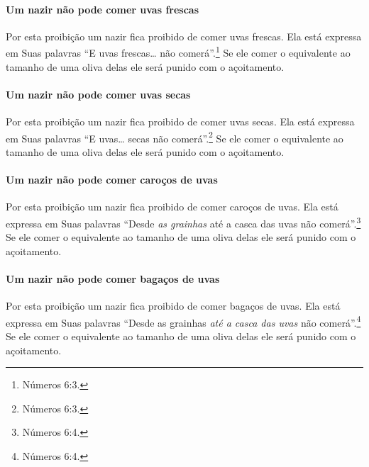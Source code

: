 \begin{multicols}{2}
\paragraph{Um nazir\starr{} não pode comer uvas frescas}

Por esta proibição um nazir\starr{} fica proibido de comer uvas frescas. Ela
está expressa em Suas palavras ``E uvas frescas\ldots{} não comerá''.\footnote{Números 6:3.} Se ele comer o equivalente ao tamanho de uma oliva delas
ele será punido com o açoitamento.

\paragraph{Um nazir\starr{} não pode comer uvas secas}

Por esta proibição um nazir\starr{} fica proibido de comer uvas secas. Ela está
expressa em Suas palavras ``E uvas\ldots{} secas não comerá''.\footnote{Números 6:3.}
Se ele comer o equivalente ao tamanho de uma oliva delas ele será punido
com o açoitamento.

\paragraph{Um nazir\starr{} não pode comer caroços de uvas}

Por esta proibição um nazir\starr{} fica proibido de comer caroços de uvas. Ela
está expressa em Suas palavras ``Desde \emph{as grainhas} até a casca
das uvas não comerá''.\footnote{Números 6:4.} Se ele comer o equivalente ao
tamanho de uma oliva delas ele será punido com o açoitamento.

\paragraph{Um nazir\starr{} não pode comer bagaços de uvas}

Por esta proibição um nazir\starr{} fica proibido de comer bagaços de uvas. Ela
está expressa em Suas palavras ``Desde as grainhas \emph{até a casca das
uvas} não comerá''.\footnote{Números 6:4.} Se ele comer o equivalente ao tamanho
de uma oliva delas ele será punido com o açoitamento.


\end{multicols}
